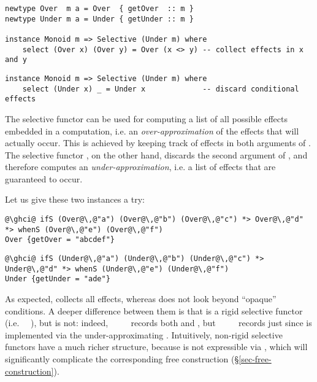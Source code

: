 {\vspace{1mm}
\begin{verbatim}
newtype Over  m a = Over  { getOver  :: m }
newtype Under m a = Under { getUnder :: m }

instance Monoid m => Selective (Under m) where
    select (Over x) (Over y) = Over (x <> y) -- collect effects in x and y
\end{verbatim}
\vspace{1mm}
\begin{verbatim}
instance Monoid m => Selective (Under m) where
    select (Under x) _ = Under x             -- discard conditional effects
\end{verbatim}
\vspace{1mm}

\noindent
The selective functor  can be used for computing a list of all possible
effects embedded in a computation, i.e. an \emph{over-approximation} of the
effects that will actually occur. This is achieved by keeping track of effects
in both arguments of . The selective functor , on the other
hand, discards the second argument of , and therefore computes an
\emph{under-approximation}, i.e. a list of effects that are guaranteed to occur.

\noindent
Let us give these two instances a try:

\vspace{1mm}
\begin{verbatim}
@\ghci@ ifS (Over@\,@"a") (Over@\,@"b") (Over@\,@"c") *> Over@\,@"d" *> whenS (Over@\,@"e") (Over@\,@"f")
Over {getOver = "abcdef"}
\end{verbatim}
\vspace{1mm}
\begin{verbatim}
@\ghci@ ifS (Under@\,@"a") (Under@\,@"b") (Under@\,@"c") *> Under@\,@"d" *> whenS (Under@\,@"e") (Under@\,@"f")
Under {getUnder = "ade"}
\end{verbatim}
\vspace{1mm}

\noindent
As expected,  collects all effects, whereas  does not look
beyond ``opaque'' conditions. A deeper difference between them is that 
is a rigid selective functor (i.e. \hs{<*>}~\hs{=}~), but  is
not: indeed, ~~\hs{<*>}~~ records both
 and , but ~~~~
records just  since  is implemented via the under-approximating
. Intuitively, non-rigid selective functors have a much richer
structure, because \hs{<*>} is not expressible via , which will
significantly complicate the corresponding free construction
(\S\ref{sec-free-construction}).

}
